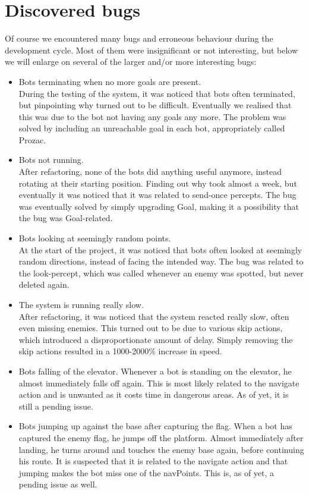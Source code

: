 \section{Discovered bugs}
Of course we encountered many bugs and erroneous behaviour during the development cycle. Most of them were insignificant or not interesting, but below we will enlarge on several of the larger and/or more interesting bugs:

\begin{itemize}
\item Bots terminating when no more goals are present. \\
	During the testing of the system, it was noticed that bots often terminated, but pinpointing why turned out to be difficult. Eventually we realised that this was due to the bot not having any goals any more. The problem was solved by including an unreachable goal in each bot, appropriately called Prozac.
	\\
\item Bots not running. \\
	After refactoring, none of the bots did anything useful anymore, instead rotating at their starting position. Finding out why took almost a week, but eventually it was noticed that it was related to send-once percepts. The bug was eventually solved by simply upgrading Goal, making it a possibility that the bug was Goal-related.
	\\
\item Bots looking at seemingly random points. \\
	At the start of the project, it was noticed that bots often looked at seemingly random directions, instead of facing the intended way. The bug was related to the look-percept, which was called whenever an enemy was spotted, but never deleted again. 
	\\
\item The system is running really slow. \\
	After refactoring, it was noticed that the system reacted really slow, often even missing enemies. This turned out to be due to various skip actions, which introduced a disproportionate amount of delay. Simply removing the skip actions resulted in a 1000-2000\% increase in speed.
	\\
\item Bots falling of the elevator.
	Whenever a bot is standing on the elevator, he almost immediately falls off again. This is most likely related to the navigate action and is unwanted as it costs time in dangerous areas. As of yet, it is still a pending issue. 
	\\
\item Bots jumping up against the base after capturing the flag.
	When a bot has captured the enemy flag, he jumps off the platform. Almost immediately after landing, he turns around and touches the enemy base again, before continuing his route. It is suspected that it is related to the navigate action and that jumping makes the bot miss one of the navPoints. This is, as of yet, a pending issue as well. 
	\\
\end{itemize}